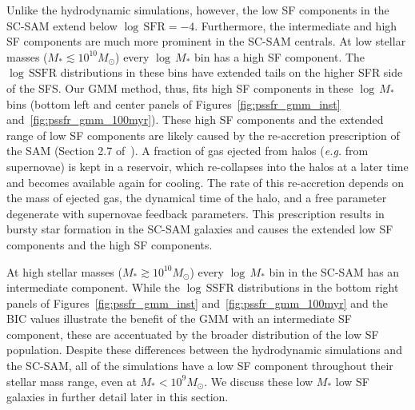 \documentclass[tighten, preprint]{aastex62}
\begin{document}
Unlike the hydrodynamic simulations, however, the low SF components in the 
SC-SAM extend below $\log\,\mathrm{SFR}{=}{-}4$. Furthermore, the intermediate 
and high SF components are much more prominent in the SC-SAM centrals. 
At low stellar masses ($M_* \lesssim 10^{10}M_\odot$) every $\log\,M_*$ 
bin has a high SF component. The $\log\,\mathrm{SSFR}$ distributions in these 
bins have extended tails on the higher SFR side of the SFS. Our GMM 
method, thus, fits high SF components in these $\log\,M_*$ bins (bottom left 
and center panels of Figures~\ref{fig:pssfr_gmm_inst} and~\ref{fig:pssfr_gmm_100myr}). 
{\color{red}
These high SF components and the extended range of low SF components are likely 
caused by the re-accretion prescription of the SAM (Section 2.7 of~\citealt{somerville2008a}).
A fraction of gas ejected from halos (\emph{e.g.} from supernovae) is kept in 
a reservoir, which re-collapses into the halos at a later time and becomes available 
again for cooling. The rate of this re-accretion depends on the mass of ejected gas, 
the dynamical time of the halo, and a free parameter degenerate with supernovae 
feedback parameters. This prescription results in bursty 
star formation in the SC-SAM galaxies and causes the extended low SF components and 
the high SF components. %
}

At high stellar masses ($M_* \gtrsim 10^{10}M_\odot$) every $\log\,M_*$ bin in the 
SC-SAM has an intermediate component. {\color{red} While the $\log\,\mathrm{SSFR}$ 
distributions in the bottom right panels of Figures~\ref{fig:pssfr_gmm_inst} 
and~\ref{fig:pssfr_gmm_100myr} and the BIC values illustrate the benefit of the 
GMM with an intermediate SF component, these are accentuated by the broader 
distribution of the low SF population. Despite these differences between the 
hydrodynamic simulations and the SC-SAM, all of the simulations have a low SF 
component throughout their stellar mass 
range, even at $M_* < 10^9M_\odot$. We discuss these low $M_*$ low SF galaxies 
in further detail later in this section.}
\end{document}

